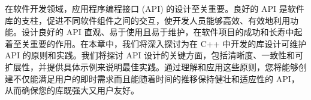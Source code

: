 在软件开发领域，应用程序编程接口 (API) 的设计至关重要。良好的 API 是软件库的支柱，促进不同软件组件之间的交互，使开发人员能够高效、有效地利用功能。设计良好的 API 直观、易于使用且易于维护，在软件项目的成功和长寿中起着至关重要的作用。在本章中，我们将深入探讨为在 C++ 中开发的库设计可维护 API 的原则和实践。我们将探讨 API 设计的关键方面，包括清晰度、一致性和可扩展性，并提供具体示例来说明最佳实践。通过理解和应用这些原则，您将能够创建不仅能满足用户的即时需求而且能随着时间的推移保持健壮和适应性的 API，从而确保您的库既强大又用户友好。